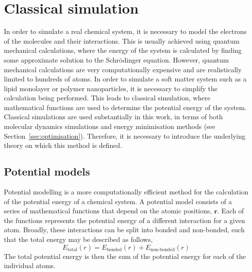 \section{Classical simulation}
\label{sec:classical}

In order to simulate a real chemical system, it is necessary to model the electrons of the molecules and their interactions.
This is usually achieved using quantum mechanical calculations, where the energy of the system is calculated by finding some approximate solution to the Schr\"{o}dinger equation.
However, quantum mechanical calculations are very computationally expensive and are realistically limited to hundreds of atoms.
In order to simulate a soft matter system such as a lipid monolayer or polymer nanoparticles, it is necessary to simplify the calculation being performed.
This leads to classical simulation, where mathematical functions are used to determine the potential energy of the system.
Classical simulations are used substantially in this work, in terms of both molecular dynamics simulations and energy minimisation methods (see Section~\ref{sec:optimisation}).
Therefore, it is necessary to introduce the underlying theory on which this method is defined.

\subsection{Potential models}
\label{sec:potentmodels}
Potential modelling is a more computationally efficient method for the calculation of the potential energy of a chemical system.
A potential model consists of a series of mathematical functions that depend on the atomic positions, $\mathbf{r}$.
Each of the functions represents the potential energy of a different interaction for a given atom.
Broadly, these interactions can be split into bonded and non-bonded, such that the total energy may be described as follows,
%
\begin{equation}
  E_{\text{total}}(r) = E_{\text{bonded}}(r) + E_{\text{non-bonded}}(r)
\end{equation}
%
The total potential energy is then the sum of the potential energy for each of the individual atoms.

